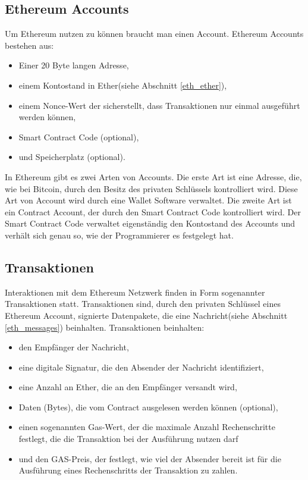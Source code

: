 \subsection{Ethereum Accounts}
Um Ethereum nutzen zu können braucht man einen Account. Ethereum Accounts bestehen aus:\\
\begin{itemize}
\item Einer 20 Byte langen Adresse,
\item einem Kontostand in Ether(siehe Abschnitt \ref{eth_ether}),
\item einem Nonce-Wert der sicherstellt, dass Transaktionen nur einmal ausgeführt werden können,
\item Smart Contract Code (optional),
\item und Speicherplatz (optional).
\end{itemize} In Ethereum gibt es zwei Arten von Accounts. Die erste Art ist eine Adresse, die, wie bei Bitcoin, durch den Besitz des privaten Schlüssels kontrolliert wird. Diese Art von Account wird durch eine Wallet Software verwaltet. Die zweite Art ist ein  Contract Account, der durch den Smart Contract Code kontrolliert wird. Der Smart Contract Code verwaltet eigenständig den Kontostand des Accounts und verhält sich genau so, wie der Programmierer es festgelegt hat.

\subsection{Transaktionen}
Interaktionen mit dem Ethereum Netzwerk finden in Form sogenannter Transaktionen statt. Transaktionen sind, durch den privaten Schlüssel eines Ethereum Account, signierte Datenpakete, die eine Nachricht(siehe Abschnitt \ref{eth_messages}) beinhalten. Transaktionen beinhalten:
\begin{itemize}
\item den Empfänger der Nachricht,
\item eine digitale Signatur, die den Absender der Nachricht identifiziert,
\item eine Anzahl an Ether, die an den Empfänger versandt wird,
\item Daten (Bytes), die vom Contract ausgelesen werden können (optional),
\item einen sogenannten Gas-Wert, der die maximale Anzahl Rechenschritte festlegt, die die Transaktion bei der Ausführung nutzen darf
\item und den GAS-Preis, der festlegt, wie viel der Absender bereit ist für die Ausführung eines Rechenschritts der Transaktion zu zahlen.
\end{itemize}

